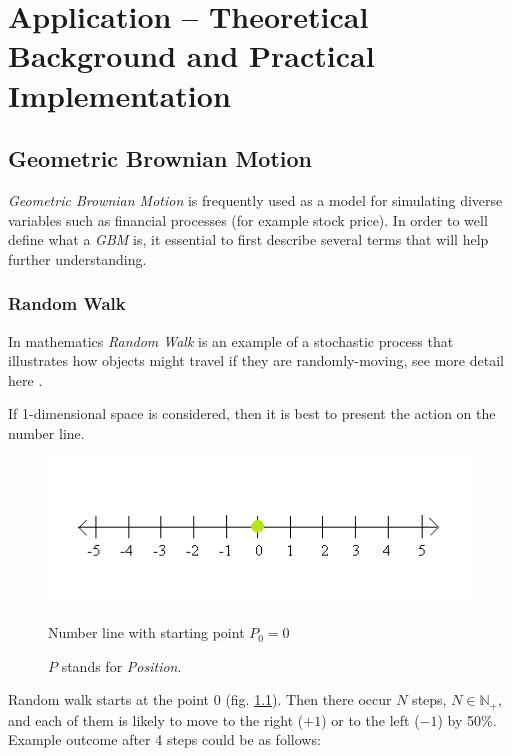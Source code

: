 \chapter{Application -- Theoretical Background and Practical Implementation}

\section{Geometric Brownian Motion}
    \textit{Geometric Brownian Motion} is frequently used as a model for simulating diverse variables such as financial processes (for example stock price). In order to well define what a \textit{GBM} is, it essential to first describe several terms that will help further understanding.
    
    \subsection{Random Walk}
        In mathematics \textit{Random Walk} is an example of a stochastic process that illustrates how objects might travel if they are randomly-moving, see more detail here \cite{randomWalk}.
        
        If 1-dimensional space is considered, then it is best to present the action on the number line.
        \begin{figure}[H]
            \centering
            \includegraphics{img/numberLine.png}
            \caption{Number line with starting point $P_0=0$}
            \caption*{$P$ stands for \textit{Position}.}
            \label{fig:numberLine_start}
        \end{figure}
        
        Random walk starts at the point 0 (fig. \ref{fig:numberLine_start}). Then there occur $N$ steps, $N \in \mathbb{N}_+$, and each of them is likely to move to the right ($+1$) or to the left ($-1$) by 50\%. Example outcome after 4 steps could be as follows:
        
